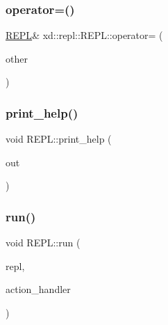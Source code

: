 \mbox{\label{classxd_1_1repl_1_1_r_e_p_l_ac25dfbc0192fd0b237c8d46f77dc7060}} 
\subsubsection{\texorpdfstring{operator=()}{operator=()}}
{\footnotesize\ttfamily \mbox{\hyperlink{classxd_1_1repl_1_1_r_e_p_l}{R\+E\+PL}}\& xd\+::repl\+::\+R\+E\+P\+L\+::operator= (\begin{DoxyParamCaption}\item[{const \mbox{\hyperlink{classxd_1_1repl_1_1_r_e_p_l}{R\+E\+PL}} \&}]{other }\end{DoxyParamCaption})\hspace{0.3cm}{\ttfamily [delete]}}

\mbox{\label{classxd_1_1repl_1_1_r_e_p_l_a8e7da66c84643eae2f35d1dd829336d2}} 
\subsubsection{\texorpdfstring{print\+\_\+help()}{print\_help()}}
{\footnotesize\ttfamily void R\+E\+P\+L\+::print\+\_\+help (\begin{DoxyParamCaption}\item[{std\+::ostream \&}]{out }\end{DoxyParamCaption})}

\mbox{\label{classxd_1_1repl_1_1_r_e_p_l_aeb27639fc9ace00650f4bf22c132e079}} 
\subsubsection{\texorpdfstring{run()}{run()}}
{\footnotesize\ttfamily void R\+E\+P\+L\+::run (\begin{DoxyParamCaption}\item[{\mbox{\hyperlink{classxd_1_1repl_1_1_r_e_p_l}{R\+E\+PL}} \&}]{repl,  }\item[{R\+E\+P\+L\+::\+Action\+Handler\+Fn}]{action\+\_\+handler }\end{DoxyParamCaption})\hspace{0.3cm}{\ttfamily [static]}}

